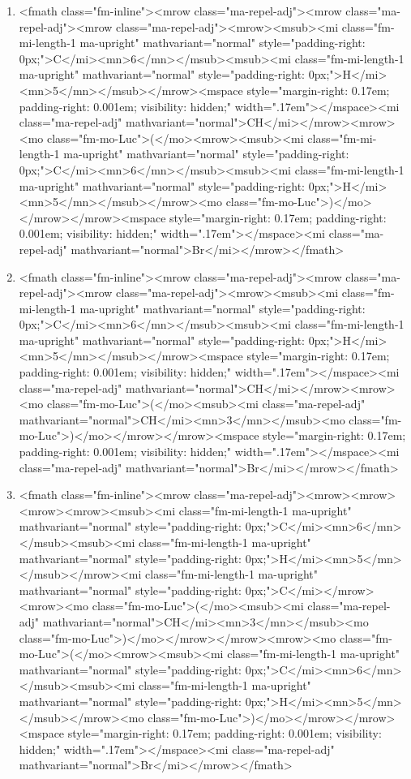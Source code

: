 \documentclass{article}
\begin{document}
\begin{enumerate}[label=(\alph*)]
\item  <fmath class="fm-inline"><mrow class="ma-repel-adj"><mrow class="ma-repel-adj"><mrow class="ma-repel-adj"><mrow><msub><mi class="fm-mi-length-1 ma-upright" mathvariant="normal" style="padding-right: 0px;">C</mi><mn>6</mn></msub><msub><mi class="fm-mi-length-1 ma-upright" mathvariant="normal" style="padding-right: 0px;">H</mi><mn>5</mn></msub></mrow><mspace style="margin-right: 0.17em; padding-right: 0.001em; visibility: hidden;" width=".17em">‌</mspace><mi class="ma-repel-adj" mathvariant="normal">CH</mi></mrow><mrow><mo class="fm-mo-Luc">(</mo><mrow><msub><mi class="fm-mi-length-1 ma-upright" mathvariant="normal" style="padding-right: 0px;">C</mi><mn>6</mn></msub><msub><mi class="fm-mi-length-1 ma-upright" mathvariant="normal" style="padding-right: 0px;">H</mi><mn>5</mn></msub></mrow><mo class="fm-mo-Luc">)</mo></mrow></mrow><mspace style="margin-right: 0.17em; padding-right: 0.001em; visibility: hidden;" width=".17em">‌</mspace><mi class="ma-repel-adj" mathvariant="normal">Br</mi></mrow></fmath>
\item  <fmath class="fm-inline"><mrow class="ma-repel-adj"><mrow class="ma-repel-adj"><mrow class="ma-repel-adj"><mrow><msub><mi class="fm-mi-length-1 ma-upright" mathvariant="normal" style="padding-right: 0px;">C</mi><mn>6</mn></msub><msub><mi class="fm-mi-length-1 ma-upright" mathvariant="normal" style="padding-right: 0px;">H</mi><mn>5</mn></msub></mrow><mspace style="margin-right: 0.17em; padding-right: 0.001em; visibility: hidden;" width=".17em">‌</mspace><mi class="ma-repel-adj" mathvariant="normal">CH</mi></mrow><mrow><mo class="fm-mo-Luc">(</mo><msub><mi class="ma-repel-adj" mathvariant="normal">CH</mi><mn>3</mn></msub><mo class="fm-mo-Luc">)</mo></mrow></mrow><mspace style="margin-right: 0.17em; padding-right: 0.001em; visibility: hidden;" width=".17em">‌</mspace><mi class="ma-repel-adj" mathvariant="normal">Br</mi></mrow></fmath>
\item  <fmath class="fm-inline"><mrow class="ma-repel-adj"><mrow><mrow><mrow><mrow><msub><mi class="fm-mi-length-1 ma-upright" mathvariant="normal" style="padding-right: 0px;">C</mi><mn>6</mn></msub><msub><mi class="fm-mi-length-1 ma-upright" mathvariant="normal" style="padding-right: 0px;">H</mi><mn>5</mn></msub></mrow><mi class="fm-mi-length-1 ma-upright" mathvariant="normal" style="padding-right: 0px;">C</mi></mrow><mrow><mo class="fm-mo-Luc">(</mo><msub><mi class="ma-repel-adj" mathvariant="normal">CH</mi><mn>3</mn></msub><mo class="fm-mo-Luc">)</mo></mrow></mrow><mrow><mo class="fm-mo-Luc">(</mo><mrow><msub><mi class="fm-mi-length-1 ma-upright" mathvariant="normal" style="padding-right: 0px;">C</mi><mn>6</mn></msub><msub><mi class="fm-mi-length-1 ma-upright" mathvariant="normal" style="padding-right: 0px;">H</mi><mn>5</mn></msub></mrow><mo class="fm-mo-Luc">)</mo></mrow></mrow><mspace style="margin-right: 0.17em; padding-right: 0.001em; visibility: hidden;" width=".17em">‌</mspace><mi class="ma-repel-adj" mathvariant="normal">Br</mi></mrow></fmath>

\end{enumerate}
\end{document}
